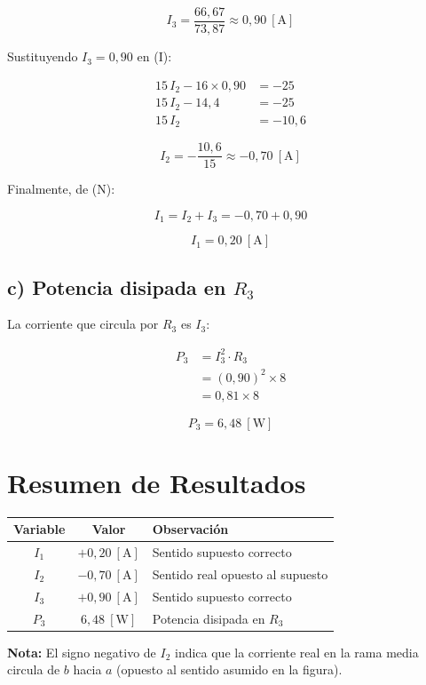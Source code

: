 \documentclass[12pt,letterpaper]{article}
\begin{document}
\[
    \boxed{I_3 = \frac{66{,}67}{73{,}87} \approx 0{,}90\ [\text{A}]}
\]

Sustituyendo $I_3 = 0{,}90$ en (I):

\begin{align*}
    15\,I_2 - 16 \times 0{,}90 &= -25 \\
    15\,I_2 - 14{,}4 &= -25 \\
    15\,I_2 &= -10{,}6
\end{align*}

\[
    \boxed{I_2 = -\frac{10{,}6}{15} \approx -0{,}70\ [\text{A}]}
\]

Finalmente, de (N):

\[
    I_1 = I_2 + I_3 = -0{,}70 + 0{,}90
\]

\[
    \boxed{I_1 = 0{,}20\ [\text{A}]}
\]

\subsection*{c) Potencia disipada en $R_3$}

La corriente que circula por $R_3$ es $I_3$:

\begin{align*}
    P_3 &= I_3^2 \cdot R_3 \\
        &= (0{,}90)^2 \times 8 \\
        &= 0{,}81 \times 8
\end{align*}

\[
    \boxed{P_3 = 6{,}48\ [\text{W}]}
\]

\section*{Resumen de Resultados}

\begin{center}
\begin{tabular}{|c|c|l|}
\hline
\textbf{Variable} & \textbf{Valor} & \textbf{Observaci\'on} \\
\hline
$I_1$ & $+0{,}20\ [\text{A}]$ & Sentido supuesto correcto \\
$I_2$ & $-0{,}70\ [\text{A}]$ & Sentido real opuesto al supuesto \\
$I_3$ & $+0{,}90\ [\text{A}]$ & Sentido supuesto correcto \\
$P_3$ & $6{,}48\ [\text{W}]$  & Potencia disipada en $R_3$ \\
\hline
\end{tabular}
\end{center}

\medskip
\noindent\textbf{Nota:} El signo negativo de $I_2$ indica que la corriente real en la rama media
circula de $b$ hacia $a$ (opuesto al sentido asumido en la figura).
\end{document}
